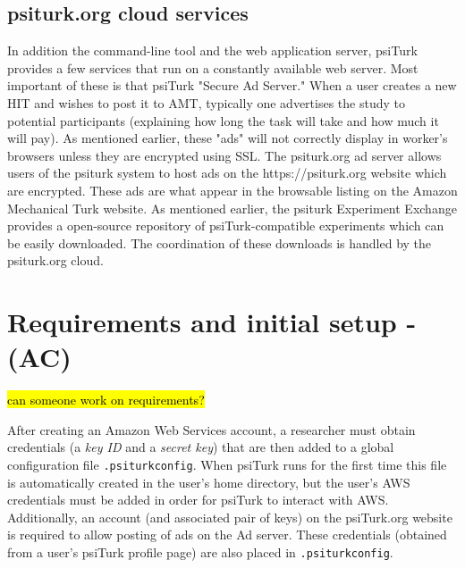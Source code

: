 \documentclass[twocolumn]{svjour3}          %
\begin{document}
\subsection{\textsf{psiturk.org} cloud services}
In addition the command-line tool and the web application server, \textsf{psiTurk}
provides a few services that run on a constantly available web server.
Most important of these is that psiTurk "Secure Ad Server."  When a user
creates a new HIT and wishes to post it to AMT, typically one advertises the
study to potential participants (explaining how long the task will take and how
much it will pay).  As mentioned earlier, these "ads" will not correctly display
in worker's browsers unless they are encrypted using SSL.  The \textsf{psiturk.org}
ad server allows users of the psiturk system to host ads on the \textsf{https://psiturk.org}
website which are encrypted.  These ads are what appear in the browsable listing
on the Amazon Mechanical Turk website.
As mentioned earlier, the psiturk Experiment Exchange provides
a open-source repository of \textsf{psiTurk}-compatible experiments which can be 
easily downloaded.  The coordination of these downloads is handled by the \textsf{psiturk.org} cloud.


\section{Requirements and initial setup - (AC)}

\hl{can someone work on requirements?}

After creating an Amazon Web Services account, a researcher must obtain credentials (a \emph{key ID} and a \emph{secret key}) that are then added to a global configuration file \texttt{.psiturkconfig}.
When psiTurk runs for the first time this file is automatically created in the user's home directory, but the user's AWS credentials must be added in order for psiTurk to interact with AWS.
Additionally, an account (and associated pair of keys) on the psiTurk.org website is required to allow posting of ads on the Ad server.
These credentials (obtained from a user's psiTurk profile page) are also placed in \texttt{.psiturkconfig}.
\end{document}
